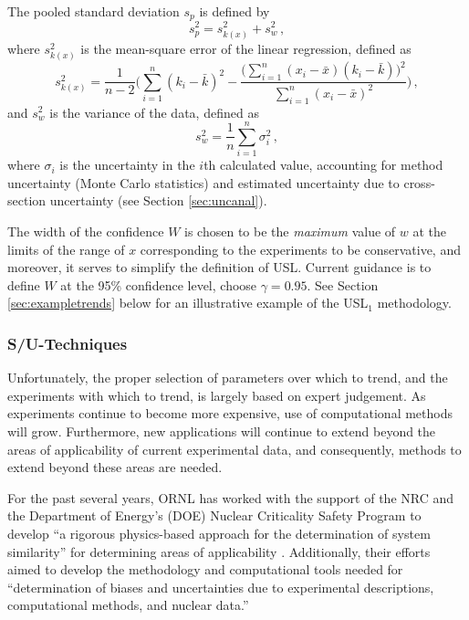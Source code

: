 The pooled standard deviation $s_p$ is defined by
\begin{equation}
 s^2_p = s^2_{k(x)} + s^2_w \, ,
\end{equation}
where $s^2_{k(x)}$ is the mean-square error of the linear regression, 
defined as
\begin{equation}
 s^2_{k(x)} = \frac{1}{n-2} \Bigg ( \sum^n_{i=1} (k_i - \bar{k})^2 - 
              \frac{\Big(\sum^n_{i=1} (x_i-\bar{x})(k_i -\bar{k}) \Big )^2 }
                   {\sum^n_{i=1} (x_i - \bar{x})^2} \Bigg ) \, ,
\end{equation}
and $s^2_w$ is the variance of the data, defined as
\begin{equation}
 s^2_w = \frac{1}{n} \sum^n_{i=1} \sigma^2_i \, ,
\end{equation}
where  $\sigma_i$ is the uncertainty in the $i$th calculated value, 
accounting for method uncertainty (\eg Monte Carlo statistics) and 
estimated uncertainty due to cross-section uncertainty 
(see Section \ref{sec:uncanal}).

The width of the confidence $W$ is chosen to be the \textit{ maximum} value 
of $w$ at the limits of the range of $x$ corresponding to the experiments 
to be conservative, and moreover, it serves to simplify the definition of 
USL.  Current guidance is to define $W$ at the 95\% confidence level, 
\ie choose $\gamma = 0.95$.  See Section \ref{sec:exampletrends} below 
for an illustrative example of the USL$_1$ methodology.


\subsubsection{S/U-Techniques}

Unfortunately, the proper selection of parameters over which to trend, 
and the experiments with which to trend, is largely based on expert 
judgement.  As experiments continue to become more expensive, use of 
computational methods will grow.  Furthermore, new applications will 
continue to extend beyond the areas of applicability of current 
experimental data, and consequently, methods to extend beyond these 
areas are needed.

For the past several years, ORNL has worked with the support of the 
NRC and the Department of Energy's (DOE) Nuclear Criticality Safety 
Program to develop ``a rigorous physics-based approach for the 
determination of system similarity'' for determining areas of 
applicability \cite{broadhead2004sau}.  Additionally, their efforts 
aimed to develop the methodology and computational tools needed for 
``determination of biases and uncertainties due to experimental 
descriptions, computational methods, and nuclear data.''

